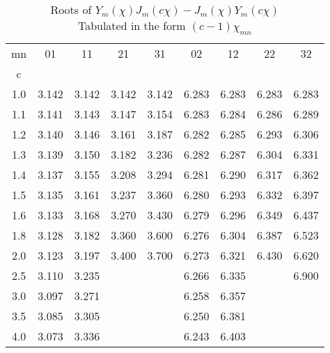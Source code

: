 \begin{table}[bht]
\begin{center}
\begin{tabular}{| c | c | c | c | c | c | c | c | c |}
\hline
mn & 01 & 11 & 21 & 31 & 02 & 12 & 22 & 32 \\
c &  &  &  &  &  &  &  &  \\ \hline
1.0 & 3.142 & 3.142 & 3.142 & 3.142 & 6.283 & 6.283 & 6.283 & 6.283 \\ 
1.1 & 3.141 & 3.143 & 3.147 & 3.154 & 6.283 & 6.284 & 6.286 & 6.289 \\ 
1.2 & 3.140 & 3.146 & 3.161 & 3.187 & 6.282 & 6.285 & 6.293 & 6.306 \\ 
1.3 & 3.139 & 3.150 & 3.182 & 3.236 & 6.282 & 6.287 & 6.304 & 6.331 \\ 
1.4 & 3.137 & 3.155 & 3.208 & 3.294 & 6.281 & 6.290 & 6.317 & 6.362 \\ 
1.5 & 3.135 & 3.161 & 3.237 & 3.360 & 6.280 & 6.293 & 6.332 & 6.397 \\ 
1.6 & 3.133 & 3.168 & 3.270 & 3.430 & 6.279 & 6.296 & 6.349 & 6.437 \\ 
1.8 & 3.128 & 3.182 & 3.360 & 3.600 & 6.276 & 6.304 & 6.387 & 6.523 \\ 
2.0 & 3.123 & 3.197 & 3.400 & 3.700 & 6.273 & 6.321 & 6.430 & 6.620 \\ 
2.5 & 3.110 & 3.235 &  &  & 6.266 & 6.335 &  & 6.900 \\ 
3.0 & 3.097 & 3.271 &  &  & 6.258 & 6.357 &  &  \\ 
3.5 & 3.085 & 3.305 &  &  & 6.250 & 6.381 &  &  \\ 
4.0 & 3.073 & 3.336 &  &  & 6.243 & 6.403 &  &  \\ \hline
\end{tabular}
\caption{ \centering Roots of $Y_m(\chi) J_m(c \chi) - J_m(\chi) Y_m(c \chi)$ \\
Tabulated in the form $(c-1)\chi_{mn}$}
\label{tab:TM-chi}
\end{center}
\end{table}